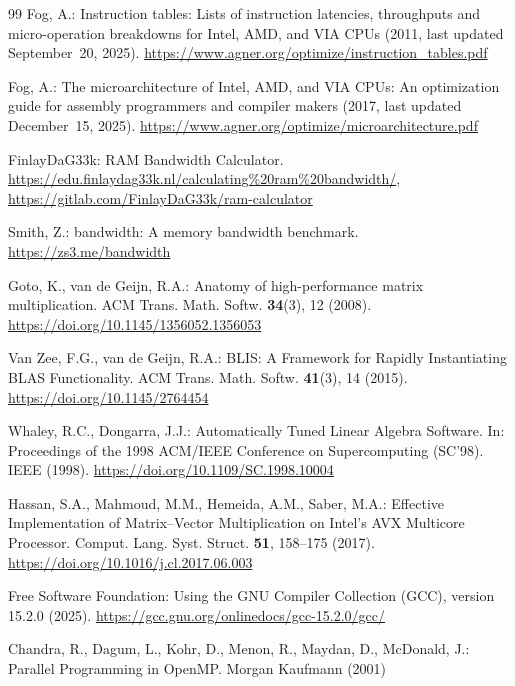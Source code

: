 \documentclass[runningheads]{llncs}
\begin{document}
\begin{thebibliography}{99}
Fog, A.:
Instruction tables: Lists of instruction latencies, throughputs and micro-operation breakdowns
for Intel, AMD, and VIA CPUs (2011, last updated September~20, 2025).
\url{https://www.agner.org/optimize/instruction_tables.pdf}

Fog, A.:
The microarchitecture of Intel, AMD, and VIA CPUs: An optimization guide for assembly programmers
and compiler makers (2017, last updated December~15, 2025).
\url{https://www.agner.org/optimize/microarchitecture.pdf}

FinlayDaG33k:
RAM Bandwidth Calculator.
\url{https://edu.finlaydag33k.nl/calculating%20ram%20bandwidth/},
\url{https://gitlab.com/FinlayDaG33k/ram-calculator}

Smith, Z.:
bandwidth: A memory bandwidth benchmark.
\url{https://zs3.me/bandwidth}

Goto, K., van de Geijn, R.A.:
Anatomy of high-performance matrix multiplication.
ACM Trans. Math. Softw. \textbf{34}(3), 12 (2008).
\url{https://doi.org/10.1145/1356052.1356053}

Van Zee, F.G., van de Geijn, R.A.:
BLIS: A Framework for Rapidly Instantiating BLAS Functionality.
ACM Trans. Math. Softw. \textbf{41}(3), 14 (2015).
\url{https://doi.org/10.1145/2764454}

Whaley, R.C., Dongarra, J.J.:
Automatically Tuned Linear Algebra Software.
In: Proceedings of the 1998 ACM/IEEE Conference on Supercomputing (SC'98).
IEEE (1998).
\url{https://doi.org/10.1109/SC.1998.10004}

Hassan, S.A., Mahmoud, M.M., Hemeida, A.M., Saber, M.A.:
Effective Implementation of Matrix--Vector Multiplication on Intel's AVX Multicore Processor.
Comput. Lang. Syst. Struct. \textbf{51}, 158--175 (2017).
\url{https://doi.org/10.1016/j.cl.2017.06.003}

Free Software Foundation:
Using the GNU Compiler Collection (GCC), version 15.2.0 (2025).
\url{https://gcc.gnu.org/onlinedocs/gcc-15.2.0/gcc/}

Chandra, R., Dagum, L., Kohr, D., Menon, R., Maydan, D., McDonald, J.:
Parallel Programming in OpenMP.
Morgan Kaufmann (2001)

\end{thebibliography}
\end{document}
